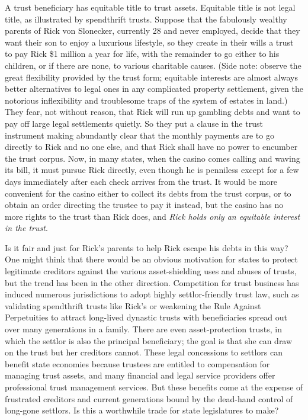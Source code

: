 \item A trust beneficiary has equitable title to trust assets. Equitable title
is not legal title, as illustrated by spendthrift trusts. Suppose that the
fabulously wealthy parents of Rick von Slonecker, currently 28 and never
employed, decide that they want their son to enjoy a luxurious lifestyle, so
they create in their wills a trust to pay Rick \$1 million a year for life, with
the remainder to go either to his children, or if there are none, to various
charitable causes. (Side note: observe the great flexibility provided by the
trust form; equitable interests are almost always better alternatives to legal
ones in any complicated property settlement, given the notorious inflexibility
and troublesome traps of the system of estates in land.) They fear, not without
reason, that Rick will run up gambling debts and want to pay off large legal
settlements quietly. So they put a clause in the trust instrument making
abundantly clear that the monthly payments are to go directly to Rick and no one
else, and that Rick shall have no power to encumber the trust corpus. Now, in
many states, when the casino comes calling and waving its bill, it must pursue
Rick directly, even though he is penniless except for a few days immediately
after each check arrives from the trust. It would be more convenient for the
casino either to collect its debts from the trust corpus, or to obtain an order
directing the trustee to pay it instead, but the casino has no more rights to
the trust than Rick does, and \textit{Rick holds only an equitable interest in
the trust}. 


Is it fair and just for Rick's parents to help Rick escape his debts in this
way? One might think that there would be an obvious motivation for states to
protect legitimate creditors against the various asset-shielding uses and abuses
of trusts, but the trend has been in the other direction. Competition for trust
business has induced numerous jurisdictions to adopt highly settlor-friendly
trust law, such as validating spendthrift trusts like Rick's or weakening the
Rule Against Perpetuities to attract long-lived dynastic trusts with
beneficiaries spread out over many generations in a family. There are even
asset-protection trusts, in which the settlor is also the principal beneficiary;
the goal is that she can draw on the trust but her creditors cannot. These legal
concessions to settlors can benefit state economies because trustees are
entitled to compensation for managing trust assets, and many financial and legal
service providers offer professional trust management services. But these
benefits come at the expense of frustrated creditors and current generations
bound by the dead-hand control of long-gone settlors. Is this a worthwhile trade
for state legislatures to make?


